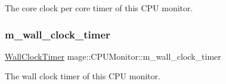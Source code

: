 The core clock per core timer of this C\+PU monitor. \mbox{\label{classmage_1_1_c_p_u_monitor_ac1e3d7a7271515873a7a82a25eca4da2}} 
\subsubsection{\texorpdfstring{m\+\_\+wall\+\_\+clock\+\_\+timer}{m\_wall\_clock\_timer}}
{\footnotesize\ttfamily \mbox{\hyperlink{namespacemage_a06f4035ef59f07892e594bf1178a108a}{Wall\+Clock\+Timer}} mage\+::\+C\+P\+U\+Monitor\+::m\+\_\+wall\+\_\+clock\+\_\+timer\hspace{0.3cm}{\ttfamily [private]}}

The wall clock timer of this C\+PU monitor. 